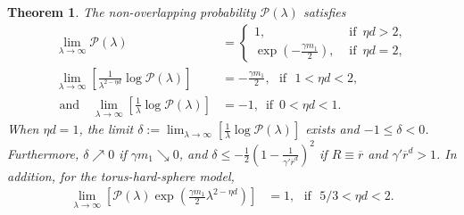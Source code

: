 \documentclass[11pt]{article}
\newcommand{\rbdd}{\overline{r}}
\newcommand{\lt}{\left}
\newcommand{\rt}{\right}
\newcommand{\pno}{\mathcal{P}(\lambda)}
\newtheorem{theorem}{Theorem}
\begin{document}
 \begin{theorem}
\label{lem:non-ovr-rand}
 The non-overlapping probability $\pno$ satisfies
\begin{align*}
 \lim_{\lambda \rightarrow \infty}\pno &= \begin{cases}  1, &\text{ if }\, \eta d > 2,\\
                                                     \exp\lt( -\frac{\gamma m_1}{2}\rt), &\text{ if }\, \eta d = 2,
 \end{cases} \\
\lim_{ \lambda \rightarrow \infty}\lt[\frac{1}{\lambda^{2-\eta d}}\log \pno\rt]  &= - \frac{\gamma m_1}{2}, \,\,\text{ if }\,\, 1 < \eta d < 2,\\
\text{ and }\, \, \, \,\lim_{\lambda \rightarrow \infty}\left[\frac{1}{\lambda}\log \pno  \right] &=   -1,\, \text{ if }\, 0 < \eta d < 1.
\end{align*}
When $\eta d = 1$, the limit $\delta := \lim_{\lambda \rightarrow \infty}\left[\frac{1}{\lambda}\log \pno  \right]$ exists and $-1 \leq \delta < 0$.
Furthermore, $\delta \nearrow 0$ if $\gamma m_1 \searrow 0$, and $\delta \leq  -\frac{1}{2} \lt(1 - \frac{1}{\gamma' \rbdd^d} \rt)^2$ if $R \equiv \rbdd$ and $\gamma' \rbdd^d > 1$.
In addition, for the torus-hard-sphere model,
\begin{align*}
 \lim_{ \lambda \rightarrow \infty}\lt[\pno\exp\lt( \frac{\gamma m_1}{2}\lambda^{2 - \eta d}\rt) \rt]  &= 1, \,\,\text{ if }\,\, 5/3 < \eta d < 2.
\end{align*}
\end{theorem}
\end{document}
